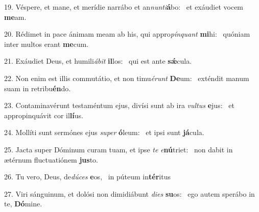 19. Véspere, et mane, et merídie narrábo et an\textit{nun}\textit{ti}\textbf{á}bo: \ast\  et exáudiet vocem \textbf{me}am.\

20. Rédimet in pace ánimam meam ab his, qui appro\textit{pín}\textit{quant} \textbf{mi}hi: \ast\  quóniam inter multos erant \textbf{me}cum.\

21. Exáudiet Deus, et humili\textit{á}\textit{bit} \textbf{il}los: \ast\  qui est ante \textbf{sǽ}cula.\

22. Non enim est illis commutátio, et non timu\textit{é}\textit{runt} \textbf{De}um: \ast\  exténdit manum suam in retribu\textbf{én}do.\

23. Contaminavérunt testaméntum ejus, divísi sunt ab ira \textit{vul}\textit{tus} \textbf{e}jus: \ast\  et appropinquávit cor il\textbf{lí}us.\

24. Mollíti sunt sermónes ejus \textit{su}\textit{per} \textbf{ó}leum: \ast\  et ipsi sunt \textbf{já}cula.\

25. Jacta super Dóminum curam tuam, et ipse \textit{te} \textit{e}\textbf{nú}triet: \ast\  non dabit in ætérnum fluctuatiónem \textbf{jus}to.\

26. Tu vero, Deus, de\textit{dú}\textit{ces} \textbf{e}os, \ast\  in púteum in\textbf{tér}itus\

27. Viri sánguinum, et dolósi non dimidiábunt \textit{di}\textit{es} \textbf{su}os: \ast\  ego autem sperábo in te, \textbf{Dó}mine.\

